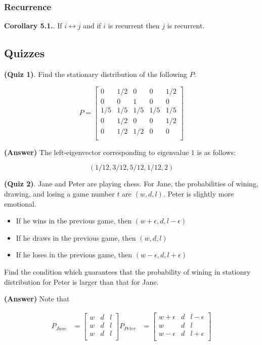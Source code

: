 \documentclass[12pt]{article}
\theoremstyle{nonumberbreak}
\begin{document}
\subsubsection{Recurrence}


\begin{theorem}
\textbf{Corollary 5.1.}. If $i \leftrightarrow j$ and if $i$ is recurrent then $j$ is recurrent.
\end{theorem}






\subsection*{Quizzes}

\textbf{(Quiz 1)}. Find the stationary distribution of the following $P$:

$$
P = \begin{bmatrix}
0 & 1/2 & 0 & 0 & 1/2 \\
0 & 0 & 1 & 0 & 0 \\
1/5 & 1/5 & 1/5 & 1/5 & 1/5 \\
0 & 1/2 & 0 & 0 & 1/2 \\
0 & 1/2 & 1/2 & 0 & 0 \\
\end{bmatrix}
$$

\textbf{(Answer)} The left-eigenvector corresponding to eigenvalue $1$ is as follows:

$$
(1/12, 3/12, 5/12, 1/12, 2)
$$



\textbf{(Quiz 2)}. Jane and Peter are playing chess. For Jane, the probabilities of wining, drawing, and losing a game number $t$ are $(w,d,l)$. Peter is slightly more emotional.

\begin{itemize}
	\item If he wins in the previous game, then $(w+\epsilon, d, l-\epsilon)$
	\item If he draws in the previous game, then $(w, d, l)$
	\item If he loses in the previous game, then $(w-\epsilon, d, l+\epsilon)$
\end{itemize}

Find the condition which guarantees that the probability of wining in stationry distribution for Peter is larger than that for Jane.


\textbf{(Answer)} Note that 

$$
\begin{aligned}
P_{Jane} &= \begin{bmatrix}
w & d & l \\
w & d & l \\
w & d & l \\
\end{bmatrix}
P_{Peter} &= \begin{bmatrix}
w + \epsilon& d & l-\epsilon \\
w & d & l \\
w - \epsilon & d & l+\epsilon \\
\end{bmatrix}
\end{aligned}
$$
\end{document}
